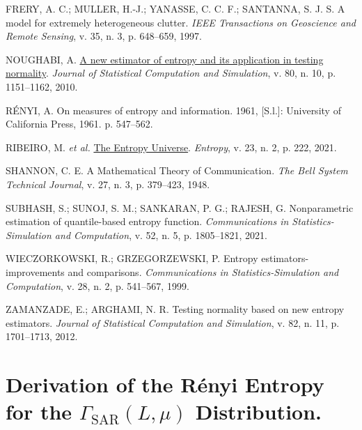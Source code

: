 \documentclass[
  letterpaper,
  11pt,
  english,
  doublespacing,
  headsepline,
  consistentlayout,
  oneside,
  openany]{MastersDoctoralThesis}
\newlength{\cslhangindent}
\newenvironment{CSLReferences}[2] %
 {\begin{list}{}{%
  \setlength{\itemindent}{0pt}
  \setlength{\leftmargin}{0pt}
  \setlength{\parsep}{0pt}
  \ifodd #1
   \setlength{\leftmargin}{\cslhangindent}
   \setlength{\itemindent}{-1\cslhangindent}
  \fi
  \setlength{\itemsep}{#2\baselineskip}}}
 {\end{list}}
\begin{document}

\label{refs}
\begin{CSLReferences}{0}{1}
FRERY, A. C.; MULLER, H.-J.; YANASSE, C. C. F.; SANTANNA, S. J. S. A
model for extremely heterogeneous clutter. \emph{{IEEE} Transactions on
Geoscience and Remote Sensing}, v. 35, n. 3, p. 648--659, 1997.

NOUGHABI, A. \href{https://doi.org/10.1080/00949650903005656}{A new
estimator of entropy and its application in testing normality}.
\emph{Journal of Statistical Computation and Simulation}, v. 80, n. 10,
p. 1151--1162, 2010.

RÉNYI, A. On measures of entropy and information. 1961, {[}S.l.{]}:
University of California Press, 1961. p. 547--562.

RIBEIRO, M. \emph{et al.} \href{https://doi.org/10.3390/e23020222}{The
Entropy Universe}. \emph{Entropy}, v. 23, n. 2, p. 222, 2021.

SHANNON, C. E. A Mathematical Theory of Communication. \emph{The Bell
System Technical Journal}, v. 27, n. 3, p. 379--423, 1948.

SUBHASH, S.; SUNOJ, S. M.; SANKARAN, P. G.; RAJESH, G. Nonparametric
estimation of quantile-based entropy function. \emph{Communications in
Statistics-Simulation and Computation}, v. 52, n. 5, p. 1805--1821,
2021.

WIECZORKOWSKI, R.; GRZEGORZEWSKI, P. Entropy estimators-improvements and
comparisons. \emph{Communications in Statistics-Simulation and
Computation}, v. 28, n. 2, p. 541--567, 1999.

ZAMANZADE, E.; ARGHAMI, N. R. Testing normality based on new entropy
estimators. \emph{Journal of Statistical Computation and Simulation}, v.
82, n. 11, p. 1701--1713, 2012.

\end{CSLReferences}

\cleardoublepage
{}
{}
\appendix

\chapter{\texorpdfstring{Derivation of the Rényi Entropy for the
\(\Gamma_{\text{SAR}}(L, \mu)\)
Distribution.}{Derivation of the Rényi Entropy for the \textbackslash Gamma\_\{\textbackslash text\{SAR\}\}(L, \textbackslash mu) Distribution.}}\label{derivation-of-the-ruxe9nyi-entropy-for-the-gamma_textsarl-mu-distribution.}
\end{document}
